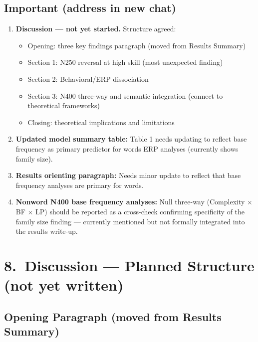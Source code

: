 \documentclass[11pt, a4paper]{article}
\begin{document}
\subsection{Important (address in new chat)}

\begin{enumerate}[leftmargin=1.5em, start=4]
  \item \textbf{Discussion — not yet started.} Structure agreed:
  \begin{itemize}
    \item Opening: three key findings paragraph (moved from Results Summary)
    \item Section 1: N250 reversal at high skill (most unexpected finding)
    \item Section 2: Behavioral/ERP dissociation
    \item Section 3: N400 three-way and semantic integration (connect to theoretical frameworks)
    \item Closing: theoretical implications and limitations
  \end{itemize}

  \item \textbf{Updated model summary table:} Table 1 needs updating to reflect base frequency as primary predictor for words ERP analyses (currently shows family size).

  \item \textbf{Results orienting paragraph:} Needs minor update to reflect that base frequency analyses are primary for words.

  \item \textbf{Nonword N400 base frequency analyses:} Null three-way (Complexity $\times$ BF $\times$ LP) should be reported as a cross-check confirming specificity of the family size finding — currently mentioned but not formally integrated into the results write-up.
\end{enumerate}

\section{8.\ Discussion — Planned Structure (not yet written)}

\subsection{Opening Paragraph (moved from Results Summary)}
\end{document}
